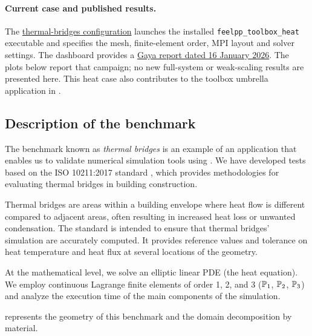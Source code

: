 \paragraph{Current case and published results.}
The \href{https://github.com/numpex/apps-feelpp/blob/main/src/app-feelpp-discr-1/ThermalBridgesENISO10211/heat_thermalbridges.json}{thermal-bridges configuration}
launches the installed \nolinkurl{feelpp_toolbox_heat} executable and specifies
the mesh, finite-element order, MPI layout and solver settings. The dashboard provides a
\href{https://numpex.github.io/apps-feelpp/apps-feelpp/leaves/gaya-feelpp_toolbox_heat-ThermalBridgesENISO10211-2026_01_16T14_41_50/leaf.html}{Gaya report dated 16 January 2026}.
The plots below report that campaign; no new full-system or weak-scaling
results are presented here. This heat case also contributes to the toolbox umbrella
application in .



\subsection{Description of the benchmark}


The benchmark known as \emph{thermal bridges} is an example of an application that enables us to validate numerical simulation tools using \Feelpp.
We have developed tests based on the ISO 10211:2017 standard \cite{noauthor_iso_2017}, which provides methodologies for evaluating thermal bridges in building construction.

Thermal bridges are areas within a building envelope where heat flow is different compared to adjacent areas, often resulting in increased heat loss or unwanted condensation.
The standard is intended to ensure that thermal bridges' simulation are accurately computed.
It provides reference values and tolerance on heat temperature and heat flux at several locations of the geometry.

At the mathematical level, we solve an elliptic linear PDE (the heat equation).
We employ continuous Lagrange finite elements of order 1, 2, and 3 ($\mathbb{P}_1$, $\mathbb{P}_2$, $\mathbb{P}_3$)
and analyze the execution time of the main components of the simulation.

 represents the geometry
of this benchmark and the domain decomposition by material.%

